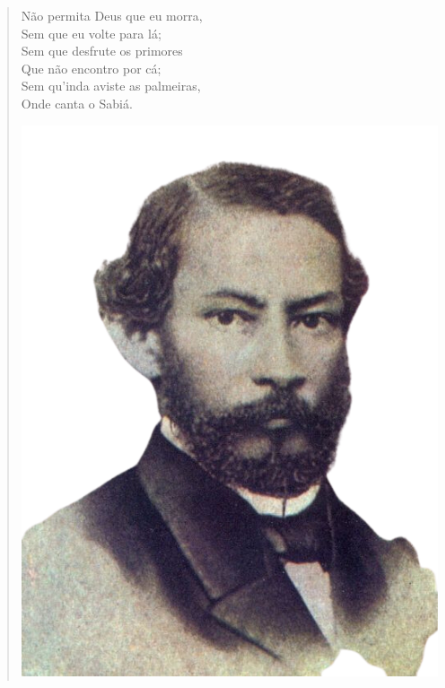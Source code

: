 \begin{myquote}
\begin{verse}
\begin{minipage}{0.5\textwidth}
Não permita Deus que eu morra, \\
Sem que eu volte para lá; \\
Sem que desfrute os primores \\
Que não encontro por cá; \\
Sem qu'inda aviste as palmeiras, \\
Onde canta o Sabiá.
\end{minipage}
\hfill
\begin{minipage}{0.45\textwidth}
  \centering
  \includegraphics[width=\textwidth]{./imgSAEB_7_POR/media/image36.png}
\end{minipage}

\end{verse}



\end{myquote}
